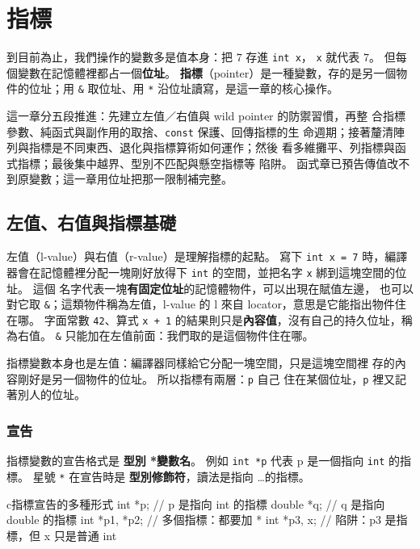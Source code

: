 \chapter{指標}
\label{ch:pointer}

到目前為止，我們操作的變數多是值本身：把 $7$ 存進 \texttt{int x}，
\texttt{x} 就代表 $7$。 但每個變數在記憶體裡都占一個\textbf{位址}。
\textbf{指標}（pointer）是一種變數，存的是另一個物件的位址；用
\texttt{\&} 取位址、用 \texttt{*} 沿位址讀寫，是這一章的核心操作。

這一章分五段推進：先建立左值／右值與 wild pointer 的防禦習慣，再整
合指標參數、純函式與副作用的取捨、\texttt{const} 保護、回傳指標的生
命週期；接著釐清陣列與指標是不同東西、退化與指標算術如何運作；然後
看多維攤平、列指標與函式指標；最後集中越界、型別不匹配與懸空指標等
陷阱。 函式章已預告傳值改不到原變數；這一章用位址把那一限制補完整。

\section{左值、右值與指標基礎}
\label{sec:ptr-basics}

左值（l-value）與右值（r-value）是理解指標的起點。 寫下
\texttt{int x = 7} 時，編譯器會在記憶體裡分配一塊剛好放得下
\texttt{int} 的空間，並把名字 \texttt{x} 綁到這塊空間的位址。 這個
名字代表一塊\textbf{有固定位址}的記憶體物件，可以出現在賦值左邊，
也可以對它取 \texttt{\&}；這類物件稱為左值，l-value 的 l 來自
locator，意思是它能指出物件住在哪。 字面常數 \texttt{42}、算式
\texttt{x + 1} 的結果則只是\textbf{內容值}，沒有自己的持久位址，稱
為右值。 \texttt{\&} 只能加在左值前面：我們取的是這個物件住在哪。

指標變數本身也是左值：編譯器同樣給它分配一塊空間，只是這塊空間裡
存的內容剛好是另一個物件的位址。 所以指標有兩層：\texttt{p} 自己
住在某個位址，\texttt{p} 裡又記著別人的位址。

\subsection{宣告}

指標變數的宣告格式是 \textbf{型別 *變數名}。 例如 \texttt{int *p}
代表 p 是一個指向 \texttt{int} 的指標。 星號 \texttt{*} 在宣告時是
\textbf{型別修飾符}，讀法是指向 \ldots 的指標。

\begin{code}{c}{指標宣告的多種形式}
int *p;           // p 是指向 int 的指標
double *q;        // q 是指向 double 的指標
int *p1, *p2;     // 多個指標：都要加 *
int *p3, x;       // 陷阱：p3 是指標，但 x 只是普通 int
\end{code}

